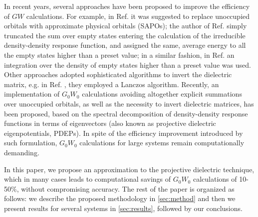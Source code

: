 \documentclass[aip,preprint]{revtex4-1}
\begin{document}
	In recent years, several approaches have been proposed to improve the efficiency of $GW$ calculations. For example, in Ref.  it was suggested to replace unoccupied orbitals with approximate physical orbitals (SAPOs); the author of Ref.  simply truncated the sum over empty states entering the calculation  of the irreducible density-density response function, and  assigned the same,  average energy to all the empty states  higher than a preset value; in a similar fashion, in Ref.   an integration over the density of empty states  higher than a preset value was used. Other approaches adopted sophisticated algorithms to invert the dielectric matrix, e.g. in Ref. , they employed a Lanczos algorithm.
	Recently, an implementation of $G_0W_0$ calculations avoiding altogether explicit summations over unoccupied orbitals, as well as the necessity to invert dielectric matrices, has been proposed,\cite{wilson2008,wilson2009,Nguyen2012-GW,Anh2013-GW,Marco2015} based on the spectral decomposition of density-density response functions in terms of eigenvectors (also known as projective dielectric eigenpotentials, PDEPs). In spite of the efficiency improvement introduced by such formulation, $G_0W_0$ calculations for large systems remain computationally demanding.

	In this paper, we propose an approximation to the projective dielectric technique,\cite{wilson2008} which in many cases leads to computational savings of $G_0W_0$ calculations of 10-50\%, without compromising accuracy. The rest of the paper is organized as follows: we describe the proposed methodology in \autoref{sec:method} and then we present results for several systems in \autoref{sec:results}, followed by our conclusions.
\end{document}
